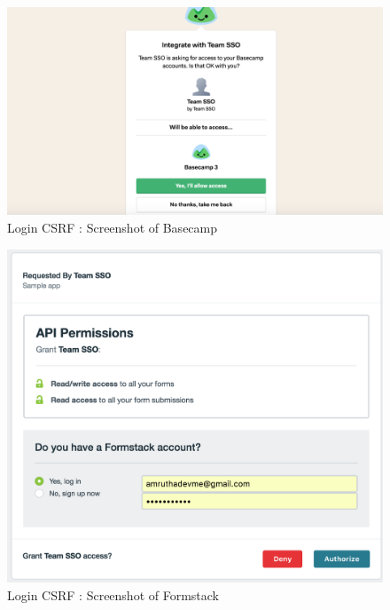 \begin{figure}[t]
   		 \centering
   		 \includegraphics[width=\columnwidth]{figures/vulnerable/basecamp.png}
   		 \caption{Login CSRF : Screenshot of Basecamp}
   		 \label{fig:basecamplogin}
	\end{figure}

\begin{figure}[t]
   		 \centering
   		 \includegraphics[width=\columnwidth]{figures/vulnerable/formstack1.png}
   		 \caption{Login CSRF : Screenshot of Formstack}
   		 \label{fig:formstacklogin}
\end{figure}


